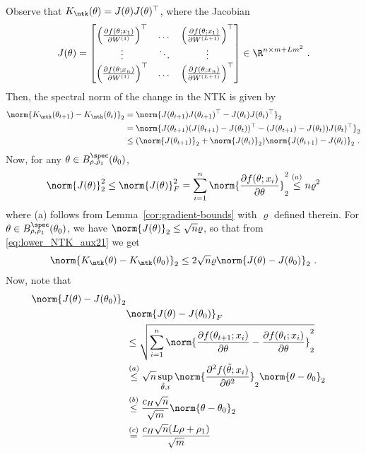 \lemmNTKball*
%
\proof
Observe that $K_{\ntk}(\theta)=J(\theta) J(\theta)^\top$, where the Jacobian
$$
J(\theta)=
\begin{bmatrix}
\left(\frac{\partial f(\theta;x_1)}{\partial W^{(1)}}\right)^\top&\dots& \left(\frac{\partial f(\theta;x_1)}{\partial W^{(L+1)}}\right)^\top\\
\vdots &\ddots&\vdots\\
\left(\frac{\partial f(\theta;x_n)}{\partial W^{(1)}}\right)^\top&\dots& \left(\frac{\partial f(\theta;x_n)}{\partial W^{(L+1)}}\right)^\top
\end{bmatrix}\in\R^{n\times m+Lm^2}~.
$$
Then, the spectral norm of the change in the NTK is given by
\begin{equation}
\label{eq:lower_NTK_aux21}
\begin{aligned}
\norm{K_{\ntk}(\theta_{t+1})-K_{\ntk}(\theta_t)}_2
    &=\norm{J(\theta_{t+1}) J(\theta_{t+1})^\top - J(\theta_t) J(\theta_t)^\top}_2\\
    &=\norm{J(\theta_{t+1}) (J(\theta_{t+1})-J(\theta_t))^\top - (J(\theta_{t+1}) - J(\theta_t)) J(\theta_t)^\top}_2\\
    &\leq (\norm{J(\theta_{t+1})}_2 + \norm{J(\theta_t)}_2) \norm{J(\theta_{t+1})-J(\theta_t)}_2~.
    \end{aligned}
\end{equation}
Now, for any $\theta\in B_{\rho,\rho_1}^{\spec}(\theta_0)$,
$$
\norm{J(\theta)}_2^2\leq \norm{J(\theta)}_F^2 = \sum^n_{i=1}\norm{\frac{\partial f(\theta;x_i)}{\partial \theta}}_2^2 \overset{(a)}{\leq} n \varrho^2
$$
where (a) follows from Lemma~\ref{cor:gradient-bounds} with $\varrho$ defined therein. For $\theta \in B_{\rho,\rho_1}^{\spec}(\theta_0)$, we have $\norm{J(\theta)}_2 \leq \sqrt{n} \varrho$, so that from \eqref{eq:lower_NTK_aux21} we get
\begin{equation}
\label{eq:lower_NTK_aux22}
\begin{aligned}
\norm{K_{\ntk}(\theta)-K_{\ntk}(\theta_0)}_2 \leq 2\sqrt{n} \varrho \norm{J(\theta)-J(\theta_0)}_2~.
    \end{aligned}
\end{equation}
Now, note that
\begin{align*}
\norm{J(\theta)-J(\theta_0)}_2\\
& \norm{J(\theta)-J(\theta_0)}_F \\
& \leq \sqrt{\sum^n_{i=1}\norm{\frac{\partial f(\theta_{t+1};x_i)}{\partial \theta} - \frac{\partial f(\theta_t;x_i)}{\partial \theta}}_2^2}\\
    &\overset{(a)}{\leq} \sqrt{n} \sup_{\tilde{\theta},i} \norm{\frac{\partial^2 f(\tilde{\theta};x_i)}{\partial \theta^2}}_2 \norm{\theta -\theta_0}_2 \\
    &\overset{(b)}{\leq}\frac{c_H\sqrt{n} }{\sqrt{m}}  \norm{\theta - \theta_0}_2\\
    &\overset{(c)}{=}  \frac{c_H \sqrt{n} (L\rho + \rho_1)}{\sqrt{{m}}} 
\end{align*}
